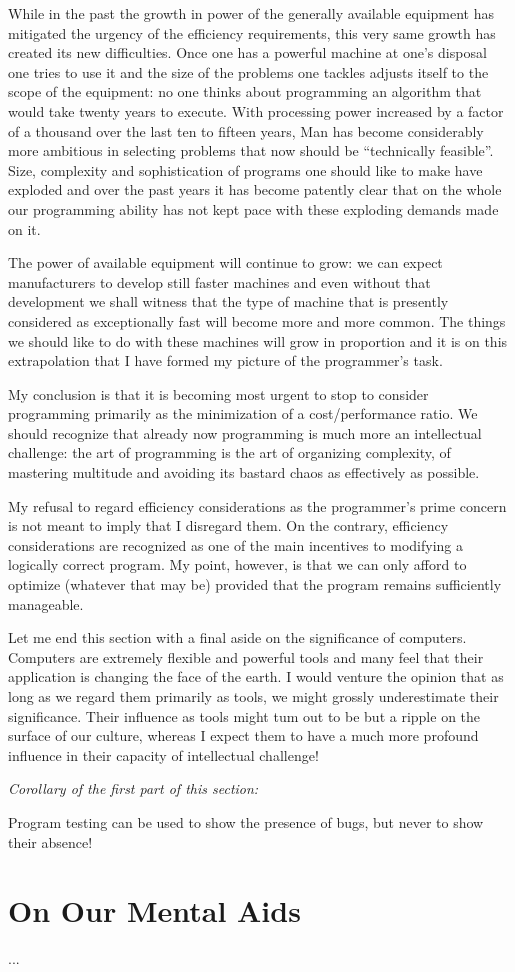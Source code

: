 While in the past the growth in power of the generally available equipment has mitigated the urgency of the efficiency requirements, this very same growth has created its new difficulties. Once one has a powerful machine at one's disposal one tries to use it and the size of the problems one tackles adjusts itself to the scope of the equipment: no one thinks about programming an algorithm that would take twenty years to execute. With processing power increased by a factor of a thousand over the last ten to fifteen years, Man has become considerably more ambitious in selecting problems that now should be ``technically feasible''. Size, complexity and sophistication of programs one should like to make have exploded and over the past years it has become patently clear that on the whole our programming ability has not kept pace with these exploding demands made on it.

The power of available equipment will continue to grow: we can expect manufacturers to develop still faster machines and even without that development we shall witness that the type of machine that is presently considered as exceptionally fast will become more and more common. The things we should like to do with these machines will grow in proportion and it is on this extrapolation that I have formed my picture of the programmer's task.

My conclusion is that it is becoming most urgent to stop to consider programming primarily as the minimization of a cost/performance ratio. We
should recognize that already now programming is much more an intellectual challenge: the art of programming is the art of organizing complexity, of mastering multitude and avoiding its bastard chaos as effectively as possible.

My refusal to regard efficiency considerations as the programmer's prime concern is not meant to imply that I disregard them. On the contrary,
efficiency considerations are recognized as one of the main incentives to modifying a logically correct program. My point, however, is that we can
only afford to optimize (whatever that may be) provided that the program remains sufficiently manageable.

Let me end this section with a final aside on the significance of computers. Computers are extremely flexible and powerful tools and many feel that their application is changing the face of the earth. I would venture the opinion that as long as we regard them primarily as tools, we might grossly underestimate their significance. Their influence as tools might tum out to be but a ripple on the surface of our culture, whereas I expect them to have a much more profound influence in their capacity of intellectual challenge!
\medskip

\noindent
\textit{Corollary of the first part of this section:}

Program testing can be used to show the presence of bugs, but never to
show their absence!

\section{On Our Mental Aids}

...
